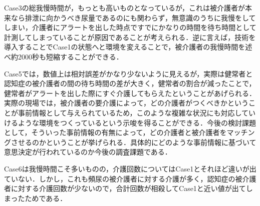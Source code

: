 Case3の総我慢時間が，もっとも高いものとなっているが，これは被介護者が本来なら排泄に向かうべき尿量であるのにも関わらず，無意識のうちに我慢をしてしまい，介護者にアラートを出した時点ですでにかなりの時間を待ち時間として計測してしまっていることが原因であることが考えられる．逆に言えば，技術を導入することでCase1の状態へと環境を変えることで，被介護者の我慢時間を述べ約2000秒も短縮することができる．

Case5では，数値上は相対誤差がかなり少ないように見えるが，実際は健常者と認知症の被介護者の間の待ち時間の差が大きく，健常者の割合が減ったことで，健常者がアラートを出した際にすぐ介護してもらえたということがあげられる．実際の現場では，被介護者の要介護によって，どの介護者がつくべきかということが事前情報として与えられているため，このような複雑な状況にも対応していけるような環境をつくっているという示唆を得ることができる．今後の検討課題として，そういった事前情報の有無によって，どの介護者と被介護者をマッチングさせるのかということが挙げられる．具体的にどのような事前情報に基づいて意思決定が行われているのか今後の調査課題である．

Case6は我慢時間こそ多いものの，介護回数についてはCase1とそれほど違いが出ていない．しかし，これも頻尿の被介護者に対する介護が多く，認知症の被介護者に対する介護回数が少ないので，合計回数が相殺してCase1と近い値が出てしまったためである．

